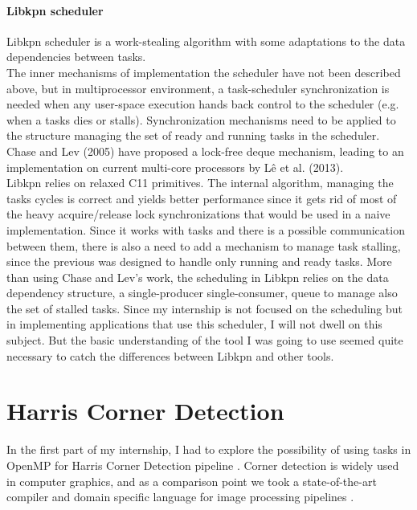 \documentclass[a4paper,11pt]{article}
\begin{document}
\paragraph{Libkpn scheduler} Libkpn scheduler is a work-stealing algorithm with some adaptations to the data dependencies between tasks. \\ 
The inner mechanisms of implementation the scheduler have not been described above, 
but in multiprocessor 
environment, a task-scheduler synchronization is needed when any user-space
execution hands back control to the scheduler (e.g. when a tasks dies or stalls).
Synchronization mechanisms need to be applied to the structure managing the set
of ready and running tasks in the scheduler. Chase and Lev (2005) have proposed a 
lock-free deque mechanism, leading to an implementation on current multi-core
processors by L\^e et al. (2013). \\
Libkpn relies on relaxed C11 primitives. The internal algorithm, managing the tasks cycles 
is correct and yields better performance since it gets rid of most of the heavy 
acquire/release lock synchronizations that would be used in a naive implementation. 
Since it works with tasks and there is a possible communication between them, there is
also a need to add a mechanism to manage task stalling, since the previous was designed
to handle only running and ready tasks. More than using Chase and Lev's work, 
the scheduling in Libkpn relies on the data dependency structure, a single-producer single-consumer,
queue to manage also the set of stalled tasks.
Since my internship is not focused on the scheduling but in implementing applications
that use this scheduler, I will not dwell on this subject. But the basic understanding
of the tool I was going to use seemed quite necessary to catch the
differences between Libkpn and other tools.


\section{Harris Corner Detection}
In the first part of my internship, I had to explore the possibility of using tasks in OpenMP
for Harris Corner Detection pipeline \cite{harris1988combined}. Corner detection is widely used 
in computer graphics, and as a comparison point we took a state-of-the-art compiler and domain 
specific language for image processing pipelines \cite{mullapudi_polymage_2015}.
\end{document}

